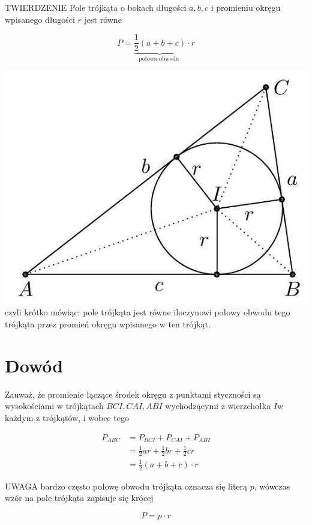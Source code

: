 \documentclass[10pt]{article}
\begin{document}
TWIERDZENIE Pole trójkąta o bokach długości \(a, b, c\) i promieniu okręgu wpisanego długości \(r\) jest równe

\[
P=\underbrace{\frac{1}{2}(a+b+c)}_{\text {połowa obwodu }} \cdot r
\]

\includegraphics[max width=\textwidth, center]{2024_11_21_e9b4faa005d5be2cc318g-039}\\
czyli krótko mówiąc: pole trójkąta jest równe iloczynowi połowy obwodu tego trójkąta przez promień okręgu wpisanego w ten trójkąt.

\section*{Dowód}
Zauważ, że promienie łączące środek okręgu z punktami styczności są wysokościami w trójkątach \(B C I, C A I, A B I\) wychodzącymi z wierzchołka \(I \mathrm{w}\) każdym z trójkątów, i wobec tego

\[
\begin{aligned}
P_{A B C} & =P_{B C I}+P_{C A I}+P_{A B I} \\
& =\frac{1}{2} a r+\frac{1}{2} b r+\frac{1}{2} c r \\
& =\frac{1}{2}(a+b+c) \cdot r
\end{aligned}
\]

UWAGA bardzo często połowę obwodu trójkąta oznacza się literą \(p\), wówczas wzór na pole trójkąta zapisuje się krócej

\[
P=p \cdot r
\]
\end{document}
